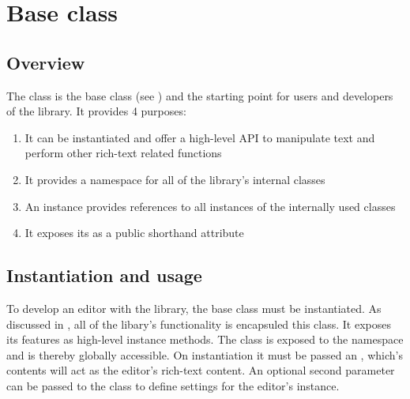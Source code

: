 





\section{Base class}
\label{sec:core}

\subsection{Overview}

The  class is the base class (see ) and the starting point for users and developers of the library. It provides 4 purposes:

\begin{enumerate}
\item It can be instantiated and offer a high-level API to manipulate text and perform other rich-text related functions
\item It provides a namespace for all of the library's internal classes
\item An instance provides references to all instances of the internally used classes
\item It exposes its  as a public shorthand attribute
\end{enumerate}

\subsection{Instantiation and usage}
\label{subsec:instantiation_usage}

To develop an editor with the library, the  base class must be instantiated. As discussed in , all of the libary's functionality is encapsuled this class. It exposes its features as high-level instance methods. The  class is exposed to the  namespace and is thereby globally accessible. On instantiation it must be passed an , which's contents will act as the editor's rich-text content. An optional second parameter can be passed to the class to define settings for the editor's instance.

